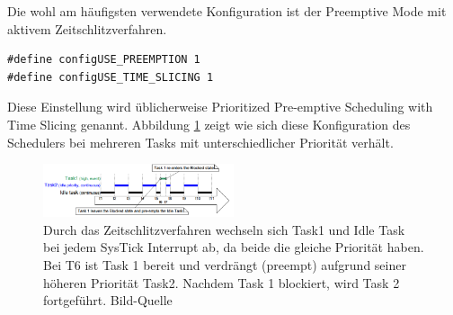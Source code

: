 Die wohl am häufigsten verwendete Konfiguration ist der Preemptive Mode mit aktivem Zeitschlitzverfahren.
\begin{lstlisting}[numbers = none]
#define configUSE_PREEMPTION 1
#define configUSE_TIME_SLICING 1
\end{lstlisting}
Diese Einstellung wird üblicherweise Prioritized Pre-emptive Scheduling with Time Slicing genannt. Abbildung \ref{fig:timeslice} zeigt wie sich diese Konfiguration des Schedulers bei mehreren Tasks mit unterschiedlicher Priorität verhält.
\begin{figure}[htb]
	\centering
		\includegraphics[width=0.5\textwidth]{Pictures/Scheduling/timeslice2.png}
	\caption{Durch das Zeitschlitzverfahren wechseln sich Task1 und Idle Task bei jedem SysTick Interrupt ab, da beide die gleiche Priorität haben. Bei T6 ist Task 1 bereit und verdrängt (preempt) aufgrund seiner höheren Priorität Task2. Nachdem Task 1 blockiert, wird Task 2 fortgeführt. Bild-Quelle~\protect{}}
	\label{fig:timeslice}
\end{figure}
